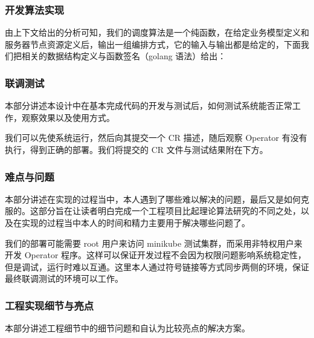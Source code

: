 \subsubsection{开发算法实现}

由上下文给出的分析可知，我们的调度算法是一个纯函数，在给定业务模型定义和服务器节点资源定义后，输出一组编排方式，它的输入与输出都是给定的，下面我们把相关的数据结构定义与函数签名（golang 语法）给出：


\subsubsection{联调测试}

本部分讲述本设计中在基本完成代码的开发与测试后，如何测试系统能否正常工作，观察效果以及使用方式。

我们可以先使系统运行，然后向其提交一个 CR 描述，随后观察 Operator 有没有执行，得到正确的部署。我们将提交的 CR 文件与测试结果附在下方。




\subsubsection{难点与问题}

本部分讲述在实现的过程当中，本人遇到了哪些难以解决的问题，最后又是如何克服的。这部分旨在让读者明白完成一个工程项目比起理论算法研究的不同之处，以及在实现的过程当中本人的时间和精力主要用于解决哪些问题了。


我们的部署可能需要 root 用户来访问 minikube 测试集群，而采用非特权用户来开发 Operator 程序。这样可以保证开发过程不会因为权限问题影响系统稳定性，但是调试，运行时难以互通。这里本人通过符号链接等方式同步两侧的环境，保证最终联调测试的环境可以工作。

\subsubsection{工程实现细节与亮点}

本部分讲述工程细节中的细节问题和自认为比较亮点的解决方案。


